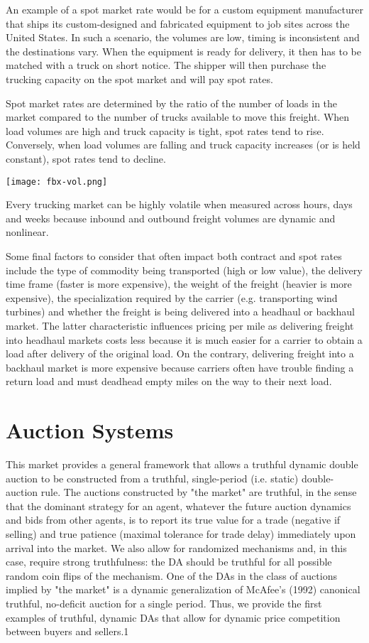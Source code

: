 \documentclass{article}
\begin{document}
	An example of a spot market rate would be for a custom equipment manufacturer that ships its custom-designed and fabricated equipment to job sites across the United States. In such a scenario, the volumes are low, timing is inconsistent and the destinations vary. When the equipment is ready for delivery, it then has to be matched with a truck on short notice. The shipper will then purchase the trucking capacity on the spot market and will pay spot rates. 

	Spot market rates are determined by the ratio of the number of loads in the market compared to the number of trucks available to move this freight. When load volumes are high and truck capacity is tight, spot rates tend to rise. Conversely, when load volumes are falling and truck capacity increases (or is held constant), spot rates tend to decline. 


\texttt{[image: fbx-vol.png]}

\hspace{}

	Every trucking market can be highly volatile when measured across hours, days and weeks because inbound and outbound freight volumes are dynamic and nonlinear.

	Some final factors to consider that often impact both contract and spot rates include the type of commodity being transported (high or low value), the delivery time frame (faster is more expensive), the weight of the freight (heavier is more expensive), the specialization required by the carrier (e.g. transporting wind turbines) and whether the freight is being delivered into a headhaul or backhaul market. The latter characteristic influences pricing per mile as delivering freight into headhaul markets costs less because it is much easier for a carrier to obtain a load after delivery of the original load. On the contrary, delivering freight into a backhaul market is more expensive because carriers often have trouble finding a return load and must deadhead empty miles on the way to their next load. 

\section{Auction Systems }
This market provides a general framework that allows a truthful dynamic double auction to be constructed from a truthful, single-period (i.e. static) double-auction rule. The auctions constructed by "the market" are truthful, in the sense that the dominant strategy for an agent, whatever the future auction dynamics and bids from other agents, is to report its true value for a trade (negative if selling) and true patience (maximal tolerance for trade delay) immediately upon arrival into the market. We also allow for randomized mechanisms and, in this case, require strong truthfulness: the DA should be truthful for all possible random
coin flips of the mechanism. One of the DAs in the class of auctions implied by "the market" is a dynamic generalization of McAfee’s (1992) canonical truthful, no-deficit auction for a single period. Thus, we provide the first examples of truthful, dynamic DAs that allow for dynamic price competition between buyers and sellers.1
\end{document}
